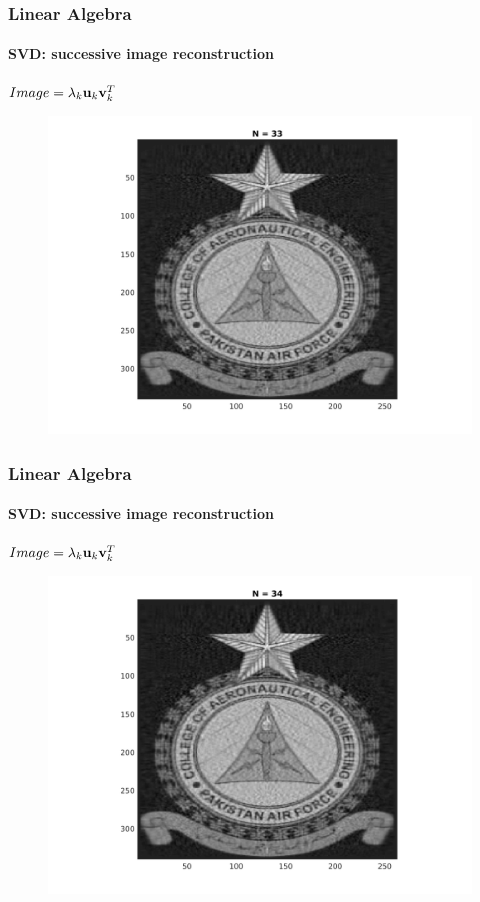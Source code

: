 \documentclass[hyperref={pdfpagelabels=true}]{beamer}
\begin{document}
\begin{frame}
\frametitle{Linear Algebra}
\framesubtitle{SVD: successive image reconstruction} 
\small{
\begin{center}
$Image = \lambda_k{\bf u}_k {\bf v}_k^T$
\end{center}}
\begin{figure}[!htb]
\centering
\includegraphics [scale=0.48]{n/b33.png}
\end{figure}
\end{frame}


\begin{frame}
\frametitle{Linear Algebra}
\framesubtitle{SVD: successive image reconstruction} 
\small{
\begin{center}
$Image = \lambda_k{\bf u}_k {\bf v}_k^T$
\end{center}}
\begin{figure}[!htb]
\centering
\includegraphics [scale=0.48]{n/b34.png}
\end{figure}
\end{frame}
\end{document}
